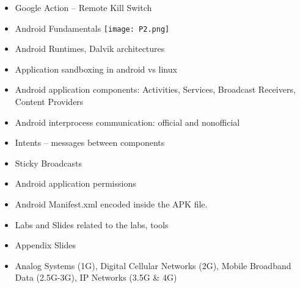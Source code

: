 \documentclass[12pt]{article}
\begin{document}
\begin{itemize}
\item Google Action – Remote Kill Switch
\item Android Fundamentals
 \texttt{[image: P2.png]}
\item Android Runtimes, Dalvik architectures
\item Application sandboxing in android vs linux
\item Android application components: Activities, Services, Broadcast Receivers, Content Providers
\item Android interprocess communication: official and nonofficial
\item Intents – messages between components
\item Sticky Broadcasts
\item Android application permissions
\item Android Manifest.xml encoded inside the APK file.
\item Labs and Slides related to the labs, tools
\item Appendix Slides
\item Analog Systems (1G), Digital Cellular Networks (2G), Mobile Broadband Data (2.5G-3G), IP Networks (3.5G & 4G)


\end{itemize}
 
\end{document}
